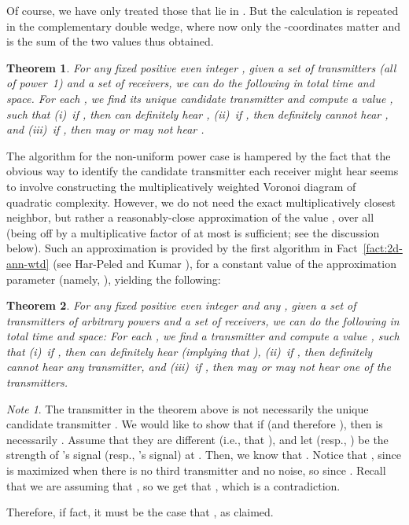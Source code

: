 \documentclass[11pt]{article}
\newtheorem{theorem}{Theorem}[section]
\theoremstyle{remark}
\newtheorem*{note}{Note}
\begin{document}
Of course, we have only treated those  that lie in .  But the calculation
is repeated in the complementary double wedge,
where now only the -coordinates matter and  is the sum of the two values thus obtained.

\begin{theorem}
  \label{th:2d-general-uniform}
  For any fixed positive even integer , given a set  of 
  transmitters (all of power~1) and a set  of  receivers, we can do the following in 
  total time  and  space.
For each , we find 
  its unique candidate transmitter  and compute a value , such that (i)~if ,
  then  can definitely hear , (ii)~if , then  definitely cannot hear , and 
(iii)~if , then  may or may not hear .
\end{theorem}

The algorithm for the non-uniform power case is hampered by the fact
that the obvious way to identify the candidate transmitter each
receiver might hear seems to involve constructing the multiplicatively
weighted Voronoi diagram of quadratic complexity.  However, we do not
need the exact multiplicatively closest neighbor, but rather a
reasonably-close approximation of the value
, over all  (being off by a
multiplicative factor of at most  is sufficient; see the discussion below).
Such an approximation is provided by the first algorithm in Fact~\ref{fact:2d-ann-wtd} (see Har-Peled and Kumar \cite{wann-focs,wann}), for a constant value of the approximation parameter  (namely, ), yielding the following:





\begin{theorem}
  \label{th:2d-general}
  For any fixed positive even integer  and any , given a set  of 
  transmitters of arbitrary powers and a set  of  receivers, we can do the following in 
  total time  and  space: For each , we find 
  a transmitter  and compute a value , such that (i)~if ,
  then  can definitely hear  (implying that ), (ii)~if , then  definitely cannot hear any transmitter, and 
  (iii)~if , then  may or may not hear one of the transmitters.
\end{theorem}

\begin{note}
  The transmitter  in the theorem above is not necessarily the unique candidate transmitter . We would like to show that if  (and therefore ), then  is necessarily . Assume that they are different (i.e., that ), and let  (resp., ) be the strength of 's signal (resp., 's signal) at . Then, we know that . Notice that , since  is maximized when there is no third transmitter and no noise, so  since . Recall that we are assuming that , so we get that , which is a contradiction. 

  Therefore, if fact, it must be the case that , as claimed.
\end{note}
\end{document}
